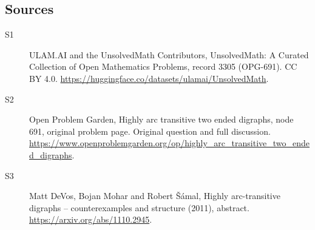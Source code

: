 \documentclass[11pt]{article}
\begin{document}
\subsection{Sources}
\begin{description}
\item[\hypertarget{source:3305:1}{S1}] ULAM.AI and the UnsolvedMath Contributors, UnsolvedMath: A Curated Collection of Open Mathematics Problems, record 3305 (OPG-691). CC BY 4.0. \url{https://huggingface.co/datasets/ulamai/UnsolvedMath}.
\item[\hypertarget{source:3305:2}{S2}] Open Problem Garden, Highly arc transitive two ended digraphs, node 691, original problem page. Original question and full discussion. \url{https://www.openproblemgarden.org/op/highly_arc_transitive_two_ended_digraphs}.
\item[\hypertarget{source:3305:3}{S3}] Matt DeVos, Bojan Mohar and Robert Šámal, Highly arc-transitive digraphs -- counterexamples and structure (2011), abstract. \url{https://arxiv.org/abs/1110.2945}.
\end{description}
\label{end:3305}
\end{document}
